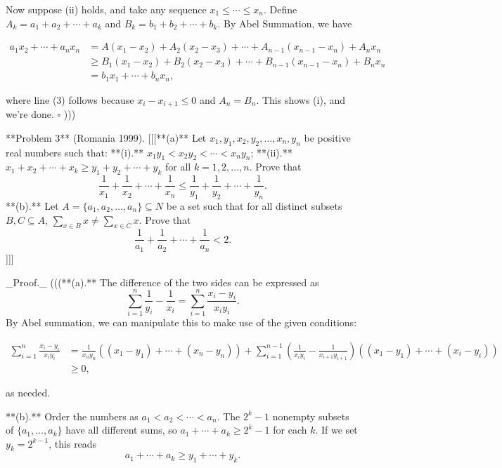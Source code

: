 Now suppose (ii) holds, and take any sequence $x_1 \leq \cdots \leq x_n$. Define $A_k = a_1 + a_2 + \cdots + a_k$ and $B_k = b_1 + b_2 + \cdots + b_k$. By Abel Summation, we have

$\begin{align*}
a_1 x_2 + \cdots + a_n x_n 
&= A(x_1 - x_2) + A_2(x_2 - x_3) + \cdots + A_{n-1}(x_{n-1} - x_n) + A_nx_n \\
&\geq B_1(x_1 - x_2) + B_2(x_2 - x_3) + \cdots + B_{n-1}(x_{n-1} - x_n) + B_n x_n \tag{3} \\
&= b_1 x_1 + \cdots + b_n x_n,
\end{align*}$

where line (3) follows because $x_i - x_{i+1} \leq 0$ and $A_n = B_n$. This shows (i), and we're done. $\square$  )))

**Problem 3** (Romania 1999).  
[[[**(a)** Let $x_1, y_1, x_2, y_2, \ldots, x_n, y_n$ be positive real numbers such that:  
**(i).** $x_1 y_1 < x_2 y_2 < \cdots < x_n y_n$;  
**(ii).** $x_1 + x_2 + \cdots + x_k \geq y_1 + y_2 + \cdots + y_k$ for all $k = 1, 2, \ldots, n$. Prove that 
\[ \frac{1}{x_1} + \frac{1}{x_2} + \cdots + \frac{1}{x_n} \leq \frac{1}{y_1} + \frac{1}{y_2} + \cdots + \frac{1}{y_n}. \]  
**(b).** Let $A = \{a_1, a_2, \ldots, a_n\} \subseteq N$ be a set such that for all distinct subsets $B, C \subseteq A$, $\sum_{x \in B} x \neq \sum_{x \in C} x$. Prove that
\[ \frac{1}{a_1} + \frac{1}{a_2} + \cdots + \frac{1}{a_n} < 2. \]  ]]]

_Proof._ (((**(a).** The difference of the two sides can be expressed as  
\[ \sum_{i=1}^n \frac{1}{y_i} - \frac{1}{x_i} = \sum_{i=1}^n \frac{x_i - y_i}{x_i y_i}. \]  
By Abel summation, we can manipulate this to make use of the given conditions:  

$\begin{align*}
\sum_{i=1}^n \frac{x_i - y_i}{x_i y_i}
&= \frac{1}{x_n y_n} ((x_1 - y_1) + \cdots + (x_n - y_n)) + \sum_{i=1}^{n-1} \left( \frac{1}{x_i y_i} - \frac{1}{x_{i+1}y_{i+1}} \right) ((x_1 - y_1) + \cdots + (x_i - y_i)) \\
&\geq 0,  
\end{align*}$

as needed.  


**(b).** Order the numbers as $a_1 < a_2 < \cdots < a_n$. The $2^k - 1$ nonempty subsets of $\{a_1, \ldots, a_k\}$ have all different sums, so $a_1 + \cdots + a_k \geq 2^k - 1$ for each $k$. If we set $y_k = 2^{k-1}$, this reads  
\[ a_1 + \cdots + a_k \geq y_1 + \cdots + y_k. \]  

